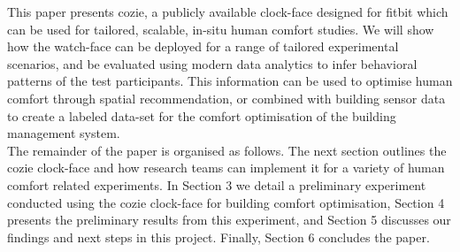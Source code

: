 This paper presents cozie, a publicly available clock-face designed for fitbit which can be used for tailored, scalable, in-situ human comfort studies. We will show how the watch-face can be deployed for a range of tailored experimental scenarios, and be evaluated using modern data analytics to infer behavioral patterns of the test participants. This information can be used to optimise human comfort through spatial recommendation, or combined with building sensor data to create a labeled data-set for the comfort optimisation of the building management system. \\




The remainder of the paper is organised as follows. The next section outlines the cozie clock-face and how research teams can implement it for a variety of human comfort related experiments. In Section 3 we detail a preliminary experiment conducted using the cozie clock-face for building comfort optimisation, Section 4 presents the preliminary results from this experiment, and Section 5 discusses our findings and next steps in this project. Finally, Section 6 concludes the paper. 
















